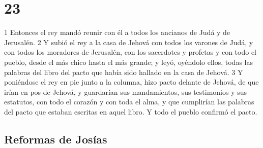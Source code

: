 \chapter{23}


1 Entonces el rey mandó reunir con él a todos los ancianos de Judá y de Jerusalén.
2 Y subió el rey a la casa de Jehová con todos los varones de Judá, y con todos los moradores de Jerusalén, con los sacerdotes y profetas y con todo el pueblo, desde el más chico hasta el más grande; y leyó, oyéndolo ellos, todas las palabras del libro del pacto que había sido hallado en la casa de Jehová.
3 Y poniéndose el rey en pie junto a la columna, hizo pacto delante de Jehová, de que irían en pos de Jehová, y guardarían sus mandamientos, sus testimonios y sus estatutos, con todo el corazón y con toda el alma, y que cumplirían las palabras del pacto que estaban escritas en aquel libro. Y todo el pueblo confirmó el pacto.
\section*{Reformas de Josías}

